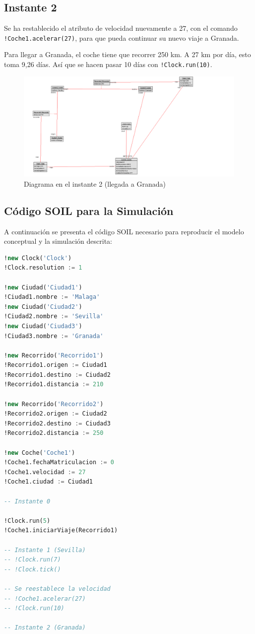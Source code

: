 \documentclass[12pt.a4paper]{article}
\begin{document}
\subsection{Instante 2}
Se ha restablecido el atributo de velocidad nuevamente a 27, con el comando \texttt{!Coche1.acelerar(27)}, para que pueda continuar su nuevo viaje a Granada.

Para llegar a Granada, el coche tiene que recorrer 250 km. A 27 km por día, esto toma 9,26 días. Así que se hacen pasar 10 días con \texttt{!Clock.run(10)}.
\vspace{-0.5cm}
\begin{figure}[H]
    \centering
    \includegraphics[width=\linewidth]{fotosInstantes/Instante2.png}
    \caption{Diagrama en el instante 2 (llegada a Granada)}
\end{figure}

\subsection{Código SOIL para la Simulación}
A continuación se presenta el código SOIL necesario para reproducir el modelo conceptual y la simulación descrita:

\begin{lstlisting}[style = useNormal,language=SQL, caption={Codigo SOIL Modelo Objetos}] 
!new Clock('Clock')
!Clock.resolution := 1

!new Ciudad('Ciudad1')
!Ciudad1.nombre := 'Malaga'
!new Ciudad('Ciudad2')
!Ciudad2.nombre := 'Sevilla'
!new Ciudad('Ciudad3')
!Ciudad3.nombre := 'Granada'

!new Recorrido('Recorrido1')
!Recorrido1.origen := Ciudad1
!Recorrido1.destino := Ciudad2
!Recorrido1.distancia := 210

!new Recorrido('Recorrido2')
!Recorrido2.origen := Ciudad2
!Recorrido2.destino := Ciudad3
!Recorrido2.distancia := 250

!new Coche('Coche1')
!Coche1.fechaMatriculacion := 0
!Coche1.velocidad := 27
!Coche1.ciudad := Ciudad1

-- Instante 0

!Clock.run(5)
!Coche1.iniciarViaje(Recorrido1)

-- Instante 1 (Sevilla)
-- !Clock.run(7)
-- !Clock.tick()

-- Se reestablece la velocidad
-- !Coche1.acelerar(27)
-- !Clock.run(10)

-- Instante 2 (Granada)

\end{lstlisting}
\end{document}
